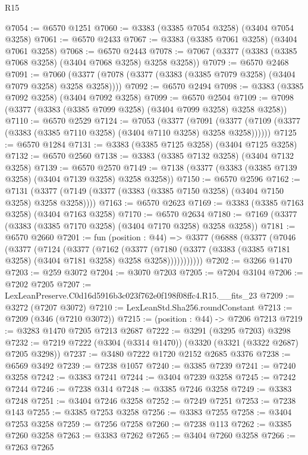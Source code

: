 \begin{lexlean}{R15}
\begin{coremodule}
@7054 := @6570 @1251
@7060 := @3383 (@3385 @7054 @3258) (@3404 @7054 @3258)
@7061 := @6570 @2433
@7067 := @3383 (@3385 @7061 @3258) (@3404 @7061 @3258)
@7068 := @6570 @2443
@7078 := @7067 (@3377 (@3383 (@3385 @7068 @3258) (@3404 @7068 @3258) @3258 @3258))
@7079 := @6570 @2468
@7091 := @7060 (@3377 (@7078 (@3377 (@3383 (@3385 @7079 @3258) (@3404 @7079 @3258) @3258 @3258))))
@7092 := @6570 @2494
@7098 := @3383 (@3385 @7092 @3258) (@3404 @7092 @3258)
@7099 := @6570 @2504
@7109 := @7098 (@3377 (@3383 (@3385 @7099 @3258) (@3404 @7099 @3258) @3258 @3258))
@7110 := @6570 @2529
@7124 := @7053
    (@3377
      (@7091 (@3377 (@7109 (@3377 (@3383 (@3385 @7110 @3258) (@3404 @7110 @3258) @3258 @3258))))))
@7125 := @6570 @1284
@7131 := @3383 (@3385 @7125 @3258) (@3404 @7125 @3258)
@7132 := @6570 @2560
@7138 := @3383 (@3385 @7132 @3258) (@3404 @7132 @3258)
@7139 := @6570 @2570
@7149 := @7138 (@3377 (@3383 (@3385 @7139 @3258) (@3404 @7139 @3258) @3258 @3258))
@7150 := @6570 @2596
@7162 := @7131 (@3377 (@7149 (@3377 (@3383 (@3385 @7150 @3258) (@3404 @7150 @3258) @3258 @3258))))
@7163 := @6570 @2623
@7169 := @3383 (@3385 @7163 @3258) (@3404 @7163 @3258)
@7170 := @6570 @2634
@7180 := @7169 (@3377 (@3383 (@3385 @7170 @3258) (@3404 @7170 @3258) @3258 @3258))
@7181 := @6570 @2660
@7201 := fun (position : @44) =>
  @3377
    (@6888
      (@3377
        (@7046
          (@3377
            (@7124
              (@3377
                (@7162
                  (@3377
                    (@7180
                      (@3377 (@3383 (@3385 @7181 @3258) (@3404 @7181 @3258) @3258 @3258)))))))))))
@7202 := @3266 @1470
@7203 := @259 @3072
@7204 := @3070 @7203
@7205 := @7204 @3104
@7206 := @7202 @7205
@7207 := LexLeanPreserve.C0d16d5916b3c023f762e0f198f08ffc4.R15.__fits_23
@7209 := @3272 (@7207 @3072)
@7210 := LexLeanStd.Sha256.roundConstant
@7213 := @7209 (@346 (@7210 @3072))
@7215 := (position : @44) -> @7206 @7213
@7219 := @3283 @1470 @7205 @7213 @2687
@7222 := @3291 (@3295 @7203) @3298
@7232 := @7219 @7222 (@3304 (@3314 @1470)) (@3320 (@3321 (@3322 @2687) @7205 @3298))
@7237 := @3480 @7222 @1720 @2152 @2685 @3376
@7238 := @6569 @3492
@7239 := @7238 @1057
@7240 := @3385 @7239
@7241 := @7240 @3258
@7242 := @3383 @7241
@7244 := @3404 @7239 @3258
@7245 := @7242 @7244
@7246 := @7238 @314
@7248 := @3385 @7246 @3258
@7249 := @3383 @7248
@7251 := @3404 @7246 @3258
@7252 := @7249 @7251
@7253 := @7238 @143
@7255 := @3385 @7253 @3258
@7256 := @3383 @7255
@7258 := @3404 @7253 @3258
@7259 := @7256 @7258
@7260 := @7238 @113
@7262 := @3385 @7260 @3258
@7263 := @3383 @7262
@7265 := @3404 @7260 @3258
@7266 := @7263 @7265

\end{coremodule}
\end{lexlean}
